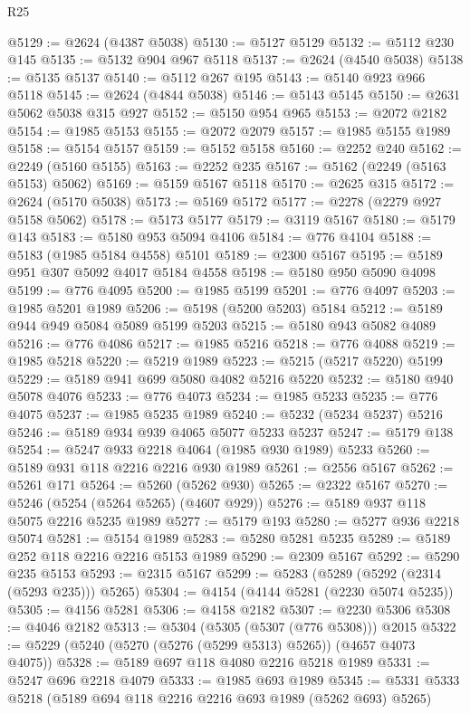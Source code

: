 \begin{lexlean}{R25}
\begin{coremodule}
@5129 := @2624 (@4387 @5038)
@5130 := @5127 @5129
@5132 := @5112 @230 @145
@5135 := @5132 @904 @967 @5118
@5137 := @2624 (@4540 @5038)
@5138 := @5135 @5137
@5140 := @5112 @267 @195
@5143 := @5140 @923 @966 @5118
@5145 := @2624 (@4844 @5038)
@5146 := @5143 @5145
@5150 := @2631 @5062 @5038 @315 @927
@5152 := @5150 @954 @965
@5153 := @2072 @2182
@5154 := @1985 @5153
@5155 := @2072 @2079
@5157 := @1985 @5155 @1989
@5158 := @5154 @5157
@5159 := @5152 @5158
@5160 := @2252 @240
@5162 := @2249 (@5160 @5155)
@5163 := @2252 @235
@5167 := @5162 (@2249 (@5163 @5153) @5062)
@5169 := @5159 @5167 @5118
@5170 := @2625 @315
@5172 := @2624 (@5170 @5038)
@5173 := @5169 @5172
@5177 := @2278 (@2279 @927 @5158 @5062)
@5178 := @5173 @5177
@5179 := @3119 @5167
@5180 := @5179 @143
@5183 := @5180 @953 @5094 @4106
@5184 := @776 @4104
@5188 := @5183 (@1985 @5184 @4558) @5101
@5189 := @2300 @5167
@5195 := @5189 @951 @307 @5092 @4017 @5184 @4558
@5198 := @5180 @950 @5090 @4098
@5199 := @776 @4095
@5200 := @1985 @5199
@5201 := @776 @4097
@5203 := @1985 @5201 @1989
@5206 := @5198 (@5200 @5203) @5184
@5212 := @5189 @944 @949 @5084 @5089 @5199 @5203
@5215 := @5180 @943 @5082 @4089
@5216 := @776 @4086
@5217 := @1985 @5216
@5218 := @776 @4088
@5219 := @1985 @5218
@5220 := @5219 @1989
@5223 := @5215 (@5217 @5220) @5199
@5229 := @5189 @941 @699 @5080 @4082 @5216 @5220
@5232 := @5180 @940 @5078 @4076
@5233 := @776 @4073
@5234 := @1985 @5233
@5235 := @776 @4075
@5237 := @1985 @5235 @1989
@5240 := @5232 (@5234 @5237) @5216
@5246 := @5189 @934 @939 @4065 @5077 @5233 @5237
@5247 := @5179 @138
@5254 := @5247 @933 @2218 @4064 (@1985 @930 @1989) @5233
@5260 := @5189 @931 @118 @2216 @2216 @930 @1989
@5261 := @2556 @5167
@5262 := @5261 @171
@5264 := @5260 (@5262 @930)
@5265 := @2322 @5167
@5270 := @5246 (@5254 (@5264 @5265) (@4607 @929))
@5276 := @5189 @937 @118 @5075 @2216 @5235 @1989
@5277 := @5179 @193
@5280 := @5277 @936 @2218 @5074
@5281 := @5154 @1989
@5283 := @5280 @5281 @5235
@5289 := @5189 @252 @118 @2216 @2216 @5153 @1989
@5290 := @2309 @5167
@5292 := @5290 @235 @5153
@5293 := @2315 @5167
@5299 := @5283 (@5289 (@5292 (@2314 (@5293 @235))) @5265)
@5304 := @4154 (@4144 @5281 (@2230 @5074 @5235))
@5305 := @4156 @5281
@5306 := @4158 @2182
@5307 := @2230 @5306
@5308 := @4046 @2182
@5313 := @5304 (@5305 (@5307 (@776 @5308))) @2015
@5322 := @5229 (@5240 (@5270 (@5276 (@5299 @5313) @5265)) (@4657 @4073 @4075))
@5328 := @5189 @697 @118 @4080 @2216 @5218 @1989
@5331 := @5247 @696 @2218 @4079
@5333 := @1985 @693 @1989
@5345 := @5331 @5333 @5218 (@5189 @694 @118 @2216 @2216 @693 @1989 (@5262 @693) @5265)

\end{coremodule}
\end{lexlean}
